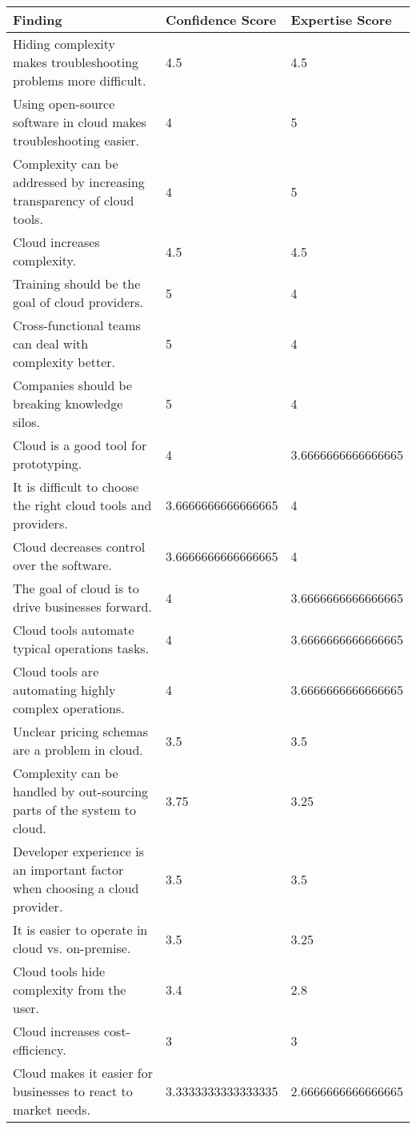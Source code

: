 
\renewcommand\arraystretch{1.5}%
\begin{longtable}{|p{10cm}|p{2cm}|p{2cm}|}
\hline
Finding  & Confidence Score & Expertise Score \\ \hline
\endhead
Hiding complexity makes troubleshooting problems more difficult. & 4.5 & 4.5 \\ \hline
Using open-source software in cloud makes troubleshooting easier. & 4 & 5 \\ \hline
Complexity can be addressed by increasing transparency of cloud tools. & 4 & 5 \\ \hline
Cloud increases complexity. & 4.5 & 4.5 \\ \hline
Training should be the goal of cloud providers. & 5 & 4 \\ \hline
Cross-functional teams can deal with complexity better. & 5 & 4 \\ \hline
Companies should be breaking knowledge silos. & 5 & 4 \\ \hline
Cloud is a good tool for prototyping. & 4 & 3.6666666666666665 \\ \hline
It is difficult to choose the right cloud tools and providers. & 3.6666666666666665 & 4 \\ \hline
Cloud decreases control over the software. & 3.6666666666666665 & 4 \\ \hline
The goal of cloud is to drive businesses forward. & 4 & 3.6666666666666665 \\ \hline
Cloud tools automate typical operations tasks. & 4 & 3.6666666666666665 \\ \hline
Cloud tools are automating highly complex operations. & 4 & 3.6666666666666665 \\ \hline
Unclear pricing schemas are a problem in cloud. & 3.5 & 3.5 \\ \hline
Complexity can be handled by out-sourcing parts of the system to cloud. & 3.75 & 3.25 \\ \hline
Developer experience is an important factor when choosing a cloud provider. & 3.5 & 3.5 \\ \hline
It is easier to operate in cloud vs. on-premise. & 3.5 & 3.25 \\ \hline
Cloud tools hide complexity from the user. & 3.4 & 2.8 \\ \hline
Cloud increases cost-efficiency. & 3 & 3 \\ \hline
Cloud makes it easier for businesses to react to market needs. & 3.3333333333333335 & 2.6666666666666665 \\ \hline

\end{longtable}
